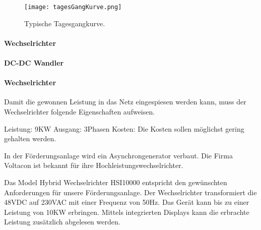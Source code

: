 
\begin{figure}[H]
\centering
\texttt{[image: tagesGangKurve.png]}
\caption{Typische Tagesgangkurve. \cite{peakWaterDemand}}
\label{fig:tagesGangKurve}
\end{figure}


\paragraph{Wechselrichter}


\paragraph{DC-DC Wandler}


\paragraph{Wechselrichter}



Damit die gewonnen Leistung in das Netz eingespiesen werden kann, muss der Wechselrichter folgende Eigenschaften aufweisen. 

Leistung: 	9KW \newline
Ausgang:	3Phasen \newline
Kosten:		Die Kosten sollen möglichst gering gehalten werden. \newline

In der Förderungsanlage wird ein Asynchrongenerator verbaut. Die Firma Voltacon ist bekannt für ihre Hochleistungswechselrichter.

Das Model Hybrid Wechselrichter HSI10000 entspricht den gewünschten Anforderungen für unsere Förderungsanlage. Der Wechselrichter transformiert die 48VDC auf 230VAC mit einer Frequenz von 50\si{\hertz}. Das Gerät kann bis zu einer Leistung von 10KW erbringen. Mittels integrierten Displays kann die erbrachte Leistung zusätzlich abgelesen werden. 

